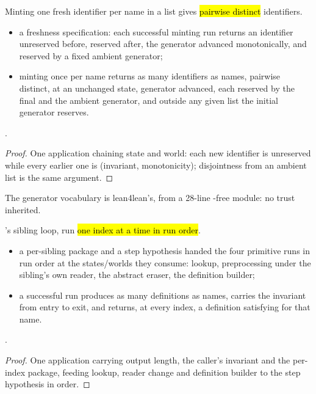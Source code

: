 \begin{theorem}
\label{thm:Erasure-run_mkFreshFVarId_list}
\leanok
{}
 Minting one fresh identifier per name in a list gives \hl{pairwise distinct}
identifiers.
\begin{itemize}
\item {} a freshness specification: each successful minting run returns an identifier
unreserved before, reserved after, the generator advanced monotonically, and reserved by a fixed
ambient generator;
\item {} minting once per name returns as many identifiers as names, pairwise distinct, at
an unchanged state, generator advanced, each reserved by the final and the ambient generator, and
outside any given list the initial generator reserves.
\end{itemize}
 \stProved{}.
\end{theorem}
\begin{proof}
\leanok
{}
 One  application chaining state and world: each new identifier is unreserved
while every earlier one is (invariant, monotonicity); disjointness from an ambient list is the same
argument.
\end{proof}

\begin{remark}
 The generator vocabulary is lean4lean's, from a 28-line -free module: no
trust inherited.
\end{remark}

\begin{theorem}
\label{thm:Erasure-run_rec_exit_siblings_chained}
\leanok
{}
 's sibling loop, run \hl{one index at a time in run order}.
\begin{itemize}
\item {} a per-sibling package  and a step hypothesis handed the four primitive
runs in run order at the states/worlds they consume: lookup, preprocessing under the sibling's own
reader, the abstract eraser, the definition builder;
\item {} a successful run produces as many definitions as names, carries the invariant from
entry to exit, and returns, at every index, a definition satisfying  for that name.
\end{itemize}
 \stProved{}.
\end{theorem}
\begin{proof}
\leanok
{}
 One  application carrying output length, the caller's invariant and the
per-index package, feeding lookup, reader change and definition builder to the step hypothesis in
order.
\end{proof}

